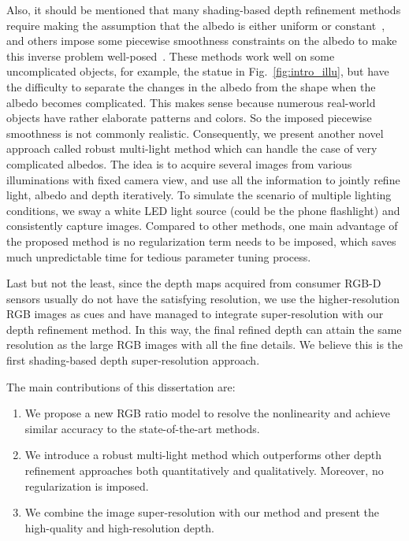 Also, it should be mentioned that many shading-based depth refinement methods require making the assumption that the albedo is either uniform or constant~\cite{wu2011shading, han2013high, park2013multiview, haque2014high, queau2017dense}, and others impose some piecewise smoothness constraints on the albedo to make this inverse problem well-posed~\cite{or2015rgbd, or2016real, kim2015joint, wu2014real}.
These methods work well on some uncomplicated objects, for example, the statue in Fig.~\ref{fig:intro_illu}, but have the difficulty to separate the changes in the albedo from the shape when the albedo becomes complicated. This makes sense because numerous real-world objects have rather elaborate patterns and colors.
So the imposed piecewise smoothness is not commonly realistic.
Consequently, we present another novel approach called robust multi-light method which can handle the case of very complicated albedos.
The idea is to acquire several images from various illuminations with fixed camera view, and use all the information to jointly refine light, albedo and depth iteratively.
To simulate the scenario of multiple lighting conditions, we sway a white LED light source (could be the phone flashlight) and consistently capture images. 
Compared to other methods, one main advantage of the proposed method is no regularization term needs to be imposed, which saves much unpredictable time for tedious parameter tuning process.

Last but not the least, since the depth maps acquired from consumer RGB-D sensors usually do not have the satisfying resolution, we use the higher-resolution RGB images as cues and have managed to integrate super-resolution with our depth refinement method.
In this way, the final refined depth can attain the same resolution as the large RGB images with all the fine details.
We believe this is the first shading-based depth super-resolution approach.

The main contributions of this dissertation are:
\begin{enumerate}
    \item We propose a new RGB ratio model to resolve the nonlinearity and achieve similar accuracy to the state-of-the-art methods.
    \item We introduce a robust multi-light method which outperforms other depth refinement approaches both quantitatively and qualitatively. Moreover, no regularization is imposed.
    \item We combine the image super-resolution with our method and present the high-quality and high-resolution depth.
\end{enumerate}


